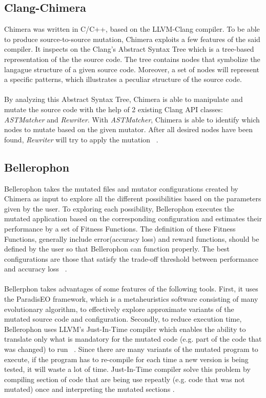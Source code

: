 \subsection{Clang-Chimera}

Chimera was written in C/C++, based on the LLVM-Clang compiler. To be able to produce source-to-source mutation, Chimera exploits a few features of the said compiler. It inspects on the Clang's Abstract Syntax Tree which is a tree-based representation of the the source code. The tree contains nodes that symbolize the langague structure of a given source code. Moreover, a set of nodes will represent a specific patterns, which illustrates a peculiar structure of the source code. \\
~\\
By analyzing this Abstract Syntax Tree, Chimera is able to manipulate and mutate the source code with the help of 2 existing Clang API classes: \textit{ASTMatcher} and \textit{Rewriter}. With \textit{ASTMatcher}, Chimera is able to identify which nodes to mutate based on the given mutator. After all desired nodes have been found, \textit{Rewriter} will try to apply the mutation ~\cite{iideaa}. \\

\subsection{Bellerophon}

Bellerophon takes the mutated files and mutator configurations created by Chimera as input to explore all the different possibilities based on the parameters given by the user. To exploring each possibility, Bellerophon executes the mutated application based on the corresponding configuration and estimates their performance by a set of Fitness Functions. The definition of these Fitness Functions, generally include error(accuracy loss) and reward functions, should be defined by the user so that Bellerophon can function properly. The best configurations are those that satisfy the trade-off threshold between performance and accuracy loss ~\cite{iideaa}. \\
~\\
Bellerphon takes advantages of some features of the following tools. First, it uses the ParadisEO framework, which is a metaheuristics software consisting of many evolutionary algorithm, to effectively explore approximate variants of the mutated source code and configuration. Secondly, to reduce execution time, Bellerophon uses LLVM's Just-In-Time compiler which enables the ability to translate only what is mandatory for the mutated code (e.g. part of the code that was changed) to run ~\cite{iideaa}. Since there are many variants of the mutated program to execute, if the program has to re-compile for each time a new version is being tested, it will waste a lot of time. Just-In-Time compiler solve this problem by compiling section of code that are being use repeatly (e.g. code that was not mutated) once and interpreting the mutated sections \cite{JIT}. \\

